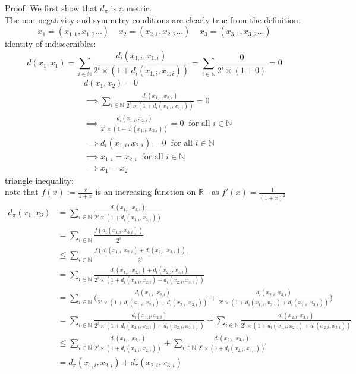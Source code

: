 \documentclass{report}
\begin{document}
Proof: We first show that $d_\pi$ is a metric.\\
The non-negativity and symmetry conditions are clearly true from the definition.
\[x_1 = (x_{1,1},x_{1,2}\ldots)\ \ \ \ \ x_2 = (x_{2,1},x_{2,2}\ldots)\ \ \ \ \ x_3 = (x_{3,1},x_{3,2}\ldots)\]
identity of indiscernibles:
\[d(x_1,x_1) = \sum_{i\in \mathbb{N}}{\frac{d_i(x_{1,i},x_{1,i})}{2^i \times (1 + d_i(x_{1,i},x_{1,i}))}} = \sum_{i\in \mathbb{N}}{\frac{0}{2^i \times (1 + 0)}}= 0\]
\begin{align*}
&d(x_1,x_2)=0\\
&\implies \sum_{i\in \mathbb{N}}{\frac{d_i(x_{1,i},x_{2,i})}{2^i \times (1 + d_i(x_{1,i},x_{2,i}))}} = 0\\
&\implies \frac{d_i(x_{1,i},x_{2,i})}{2^i \times (1 + d_i(x_{1,i},x_{2,i}))} = 0\ \text{ for all } i \in \mathbb{N}\\
&\implies d_i(x_{1,i},x_{2,i}) = 0 \ \text{ for all }i \in \mathbb{N}\\
&\implies x_{1,i} = x_{2,i}\ \text{ for all }i \in \mathbb{N}\\
&\implies x_{1} = x_{2}
\end{align*}
triangle inequality:\\
note that $f(x):= \frac{x}{1+x}$ is an increasing function on $\mathbb{R}^+$ as $f' (x)= \frac{1}{(1+x)^2}$\\
\begin{align*}
d_\pi(x_1,x_3) &= \sum_{i\in \mathbb{N}}{\frac{d_i(x_{1,i},x_{3,i})}{2^i \times (1 + d_i(x_{1,i},x_{3,i}))}}\\
&= \sum_{i\in \mathbb{N}}{\frac{f(d_i(x_{1,i},x_{3,i}))}{2^i}}\\
&\leq \sum_{i\in \mathbb{N}}{\frac{f(d_i(x_{1,i},x_{2,i}) + d_i(x_{2,i},x_{3,i}))}{2^i}}\\
&= \sum_{i\in \mathbb{N}}{ \frac{d_i(x_{1,i},x_{2,i}) + d_i(x_{2,i},x_{3,i})}{2^i \times (1 + d_i(x_{1,i},x_{2,i})+d_i(x_{2,i},x_{3,i}))}}\\
&= \sum_{i\in \mathbb{N}}{\Big( \frac{d_i(x_{1,i},x_{2,i})}{2^i \times (1 + d_i(x_{1,i},x_{2,i})+d_i(x_{2,i},x_{3,i}))} + \frac{d_i(x_{2,i},x_{3,i})}{2^i \times (1 + d_i(x_{1,i},x_{2,i})+d_i(x_{2,i},x_{3,i}))}\Big)}\\
&= \sum_{i\in \mathbb{N}}{ \frac{d_i(x_{1,i},x_{2,i})}{2^i \times (1 + d_i(x_{1,i},x_{2,i})+d_i(x_{2,i},x_{3,i}))}} + \sum_{i\in \mathbb{N}}{\frac{d_i(x_{2,i},x_{3,i})}{2^i \times (1 + d_i(x_{1,i},x_{2,i})+d_i(x_{2,i},x_{3,i}))}}\\
&\leq \sum_{i\in \mathbb{N}}{\frac{d_i(x_{1,i},x_{2,i})}{2^i \times (1 + d_i(x_{1,i},x_{2,i}))}} + \sum_{i\in \mathbb{N}}{\frac{d_i(x_{2,i},x_{3,i})}{2^i \times (1 + d_i(x_{2,i},x_{3,i}))}}\\
&=d_\pi (x_{1,i},x_{2,i}) + d_\pi (x_{2,i},x_{3,i})
\end{align*}
\end{document}
